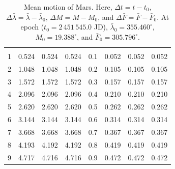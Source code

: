 \begin{table}[!h]
\begin{tabular}{rrrr|rrrr}
&&&&&&&\\
1 &   0.524 &   0.524 &   0.524 & 0.1 &   0.052 &   0.052 &   0.052\\
2 &   1.048 &   1.048 &   1.048 & 0.2 &   0.105 &   0.105 &   0.105\\
3 &   1.572 &   1.572 &   1.572 & 0.3 &   0.157 &   0.157 &   0.157\\
4 &   2.096 &   2.096 &   2.096 & 0.4 &   0.210 &   0.210 &   0.210\\
5 &   2.620 &   2.620 &   2.620 & 0.5 &   0.262 &   0.262 &   0.262\\
6 &   3.144 &   3.144 &   3.144 & 0.6 &   0.314 &   0.314 &   0.314\\
7 &   3.668 &   3.668 &   3.668 & 0.7 &   0.367 &   0.367 &   0.367\\
8 &   4.193 &   4.192 &   4.192 & 0.8 &   0.419 &   0.419 &   0.419\\
9 &   4.717 &   4.716 &   4.716 & 0.9 &   0.472 &   0.472 &   0.472\\
\end{tabular}
\caption{ Mean motion of Mars.  Here, $\Delta t = t-t_0$, $\Delta\bar{\lambda} = \bar{\lambda}-\bar{\lambda}_0$, $\Delta M = M - M_0$,
and $\Delta\bar{F} = \bar{F}-\bar{F}_0$.  At epoch  ($t_0 = 2\,451\,545.0$ JD), $\bar{\lambda}_0 = 355.460^\circ$, $M_0 = 19.388^\circ$, and
$\bar{F}_0 =305.796^\circ$. }\label{vt8}
\end{table}

